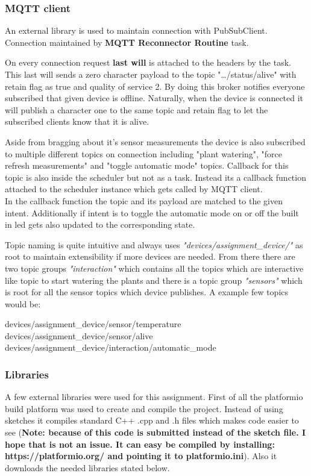 \documentclass[11pt,a4paper]{article}
\begin{document}
\subsubsection{MQTT client}
An external library is used to maintain connection with PubSubClient. Connection maintained by \textbf{MQTT Reconnector Routine} task.\bigskip

On every connection request \textbf{last will} is attached to the headers by the task. This last will sends a zero character payload to the topic "\dots/status/alive" with retain flag as true and quality of service 2. By doing this broker notifies everyone subscribed that given device is offline. Naturally, when the device is connected it will publish a character one to the same topic and retain flag to let the subscribed clients know that it is alive.\bigskip

Aside from bragging about it's sensor measurements the device is also subscribed to multiple different topics on connection including "plant watering", "force refresh measurements" and "toggle automatic mode" topics. Callback for this topic is also inside the scheduler but not as a task. Instead its a callback function attached to the scheduler instance which gets called by MQTT client.\\In the callback function the topic and its payload are matched to the given intent. Additionally if intent is to toggle the automatic mode on or off the built in led gets also updated to the corresponding state.\bigskip

Topic naming is quite intuitive and always uses \textit{"devices/assignment\_device/"} as root to maintain extensibility if more devices are needed. From there there are two topic groups \textit{"interaction"} which contains all the topics which are interactive like topic to start watering the plants and there is a topic group \textit{"sensors"} which is root for all the sensor topics which device publishes. A example few topics would be:

\begin{center}
devices/assignment\_device/sensor/temperature\\
devices/assignment\_device/sensor/alive\\
devices/assignment\_device/interaction/automatic\_mode\\
\end{center}

\subsubsection{Libraries}
A few external libraries were used for this assignment. First of all the platformio build platform was used to create and compile the project. Instead of using sketches it compiles standard C++ .cpp and .h files which makes code easier to see (\textbf{Note: because of this code is submitted instead of the sketch file. I hope that is not an issue. It can easy be compiled by installing: https://platformio.org/ and pointing it to platformio.ini}). Also it downloads the needed libraries stated below.
\end{document}
